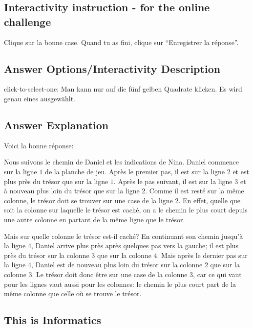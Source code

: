 \documentclass[a4paper,11pt]{report}
\newcommand{\taskGraphicsFolder}{..}
\begin{document}
\subsection*{Interactivity instruction - for the online challenge}

Clique sur la bonne case. Quand tu as fini, clique sur “Enregistrer la réponse”.

\begingroup
\renewcommand{\arraystretch}{1.5}
\subsection*{Answer Options/Interactivity Description}

click-to-select-one:  Man kann nur auf die fünf gelben Quadrate klicken. Es wird genau eines ausgewählt.

\endgroup

\subsection*{Answer Explanation}

Voici la bonne réponse:

{\centering%
\par}

Nous suivons le chemin de Daniel et les indications de Nina. Daniel commence sur la ligne $1$ de la planche de jeu. Après le premier pas, il est sur la ligne $2$ et est plus près du trésor que sur la ligne $1$. Après le pas suivant, il est sur la ligne $3$ et à nouveau plus loin du trésor que sur la ligne $2$. Comme il est resté sur la même colonne, le trésor doit se trouver sur une case de la ligne $2$. En effet, quelle que soit la colonne sur laquelle le trésor est caché, on a le chemin le plus court depuis une autre colonne en partant de la même ligne que le trésor.

Mais sur quelle colonne le trésor est-il caché? En continuant son chemin jusqu’à la ligne $4$, Daniel arrive plus près après quelques pas vers la gauche; il est plus près du trésor sur la colonne $3$ que sur la colonne $4$. Mais après le dernier pas sur la ligne $4$, Daniel est de nouveau plus loin du trésor sur la colonne $2$ que sur la colonne $3$. Le trésor doit donc être sur une case de la colonne $3$, car ce qui vaut pour les lignes vaut aussi pour les colonnes: le chemin le plus court part de la même colonne que celle où se trouve le trésor.


\subsection*{This is Informatics}
\end{document}
